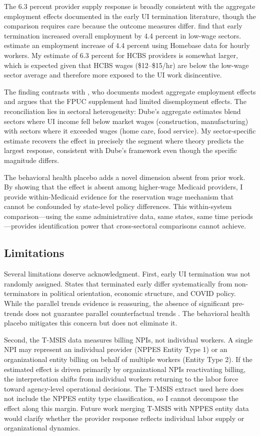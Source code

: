 \documentclass[12pt]{article}
\begin{document}
The 6.3 percent provider supply response is broadly consistent with the aggregate employment effects documented in the early UI termination literature, though the comparison requires care because the outcome measures differ. \citet{holzer2021} find that early termination increased overall employment by 4.4 percent in low-wage sectors. \citet{coombs2022} estimate an employment increase of 4.4 percent using Homebase data for hourly workers. My estimate of 6.3 percent for HCBS providers is somewhat larger, which is expected given that HCBS wages (\$12--\$15/hr) are below the low-wage sector average and therefore more exposed to the UI work disincentive.

The finding contrasts with \citet{dube2021}, who documents modest aggregate employment effects and argues that the FPUC supplement had limited disemployment effects. The reconciliation lies in sectoral heterogeneity: Dube's aggregate estimates blend sectors where UI income fell below market wages (construction, manufacturing) with sectors where it exceeded wages (home care, food service). My sector-specific estimate recovers the effect in precisely the segment where theory predicts the largest response, consistent with Dube's framework even though the specific magnitude differs.

The behavioral health placebo adds a novel dimension absent from prior work. By showing that the effect is absent among higher-wage Medicaid providers, I provide within-Medicaid evidence for the reservation wage mechanism that cannot be confounded by state-level policy differences. This within-system comparison---using the same administrative data, same states, same time periods---provides identification power that cross-sectoral comparisons cannot achieve.

\subsection{Limitations}

Several limitations deserve acknowledgment. First, early UI termination was not randomly assigned. States that terminated early differ systematically from non-terminators in political orientation, economic structure, and COVID policy. While the parallel trends evidence is reassuring, the absence of significant pre-trends does not guarantee parallel counterfactual trends \citep{roth2022}. The behavioral health placebo mitigates this concern but does not eliminate it.

Second, the T-MSIS data measures billing NPIs, not individual workers. A single NPI may represent an individual provider (NPPES Entity Type 1) or an organizational entity billing on behalf of multiple workers (Entity Type 2). If the estimated effect is driven primarily by organizational NPIs reactivating billing, the interpretation shifts from individual workers returning to the labor force toward agency-level operational decisions. The T-MSIS extract used here does not include the NPPES entity type classification, so I cannot decompose the effect along this margin. Future work merging T-MSIS with NPPES entity data would clarify whether the provider response reflects individual labor supply or organizational dynamics.
\end{document}
